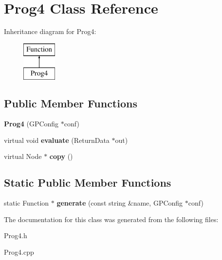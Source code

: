 \hypertarget{class_prog4}{\section{Prog4 Class Reference}
\label{class_prog4}
}
Inheritance diagram for Prog4\-:\begin{figure}[H]
\begin{center}
\leavevmode
\includegraphics[height=2.000000cm]{class_prog4}
\end{center}
\end{figure}
\subsection*{Public Member Functions}
\begin{DoxyCompactItemize}
\item 
\hypertarget{class_prog4_a5e86ff04b5e8652f917f2a838fa6b0aa}{{\bfseries Prog4} (G\-P\-Config $\ast$conf)}\label{class_prog4_a5e86ff04b5e8652f917f2a838fa6b0aa}

\item 
\hypertarget{class_prog4_a2bd6ea497e7e6d4ab5c109dd37ced620}{virtual void {\bfseries evaluate} (Return\-Data $\ast$out)}\label{class_prog4_a2bd6ea497e7e6d4ab5c109dd37ced620}

\item 
\hypertarget{class_prog4_a855801b596cb17fe45c8fde5c701ea08}{virtual Node $\ast$ {\bfseries copy} ()}\label{class_prog4_a855801b596cb17fe45c8fde5c701ea08}

\end{DoxyCompactItemize}
\subsection*{Static Public Member Functions}
\begin{DoxyCompactItemize}
\item 
\hypertarget{class_prog4_a4a828b4aadd8faac2f642ab2bdd45d58}{static Function $\ast$ {\bfseries generate} (const string \&name, G\-P\-Config $\ast$conf)}\label{class_prog4_a4a828b4aadd8faac2f642ab2bdd45d58}

\end{DoxyCompactItemize}


The documentation for this class was generated from the following files\-:\begin{DoxyCompactItemize}
\item 
Prog4.\-h\item 
Prog4.\-cpp\end{DoxyCompactItemize}
